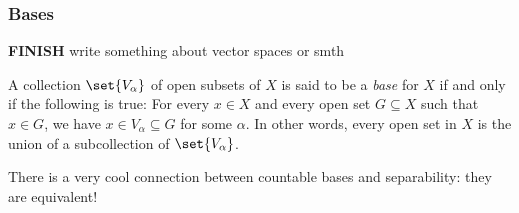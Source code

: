 \documentclass[class=article, crop=false]{standalone}
\begin{document}
\subsubsection*{Bases}

\textbf{FINISH} write something about vector spaces or smth

\begin{defn}
    A collection $\set{V_\alpha}$ of open subsets of $X$ is said to be a \textit{base} for $X$ if and only if the following is true: For every $x \in X$ and every open set $G \subseteq X$ such that $x \in G$, we have $x \in V_\alpha \subseteq G$ for some $\alpha$. In other words, every open set in $X$ is the union of a subcollection of $\set{V_\alpha}$.
\end{defn}

There is a very cool connection between countable bases and separability: they are equivalent!
\end{document}
